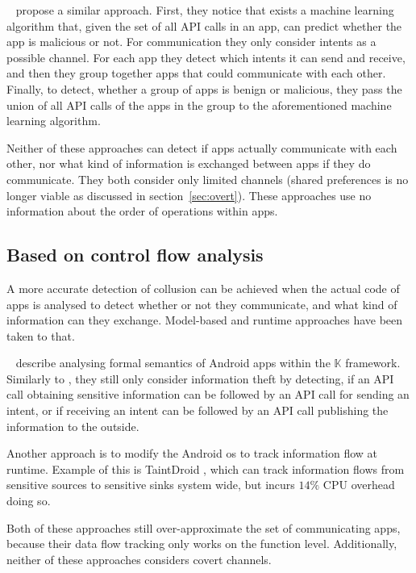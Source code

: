 \documentclass[article, oneside]{aaltoseries}
\newcommand{\sref}[1]{section~\ref{#1}}
\begin{document}
\citeauthor{Chen2018}~\cite{Chen2018} propose a similar approach. First, they notice that exists a machine learning algorithm that, given the set of all API calls in an app, can predict whether the app is malicious or not. For communication they only consider intents as a possible channel. For each app they detect which intents it can send and receive, and then they group together apps that could communicate with each other. Finally, to detect, whether a group of apps is benign or malicious, they pass the union of all API calls of the apps in the group to the aforementioned machine learning algorithm.

Neither of these approaches can detect if apps actually communicate with each other, nor what kind of information is exchanged between apps if they do communicate. They both consider only limited channels (shared preferences is no longer viable as discussed in \sref{sec:overt}). These approaches use no information about the order of operations within apps.

\subsection{Based on control flow analysis}

A more accurate detection of collusion can be achieved when the actual code of apps is analysed to detect whether or not they communicate, and what kind of information can they exchange. Model-based and runtime approaches have been taken to that.

\citeauthor{Asavoae2018}~\cite{Asavoae2018} describe analysing formal semantics of Android apps within the $\mathbb{K}$ framework. Similarly to \cite{Asavoae2016}, they still only consider information theft by detecting, if an API call obtaining sensitive information can be followed by an API call for sending an intent, or if receiving an intent can be followed by an API call publishing the information to the outside.

Another approach is to modify the Android \gls{os} to track information flow at runtime. Example of this is TaintDroid \cite{Enck2014}, which can track information flows from sensitive sources to sensitive sinks system wide, but incurs $14\%$ CPU overhead doing so.

Both of these approaches still over-approximate the set of communicating apps, because their data flow tracking only works on the function level. Additionally, neither of these approaches considers covert channels.
\end{document}

